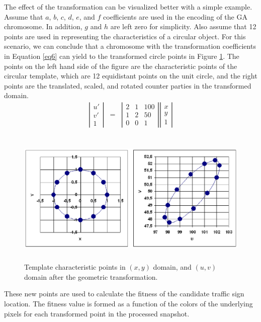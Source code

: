 \documentclass[a4paper,oneside,12pt]{report}
\begin{document}
The effect of the transformation can be visualized better with a simple example. Assume that $a$, $b$, $c$, $d$, $e$, and $f$ coefficients are used in the encoding of the GA chromosome. In addition, $g$ and $h$ are left zero for simplicity. Also assume that 12 points are used in representing the characteristics of a circular object. For this scenario, we can conclude that a chromosome with the transformation coefficients in Equation \ref{eq6} can yield to the transformed circle points in Figure \ref{fig:sdfig6}. The points on the left hand side of the figure are the characteristic points of the circular template, which are 12 equidistant points on the unit circle, and the right points are the translated, scaled, and rotated counter parties in the transformed domain. 
\begin{eqnarray}
\label{eq6}
\left| \begin{array}{ccc} u' \\ v' \\ 1 \end{array} \right| &=& 
\left| \begin{array}{ccc} 2 & 1 & 100 \\ 1 & 2 & 50 \\ 0 & 0 & 1 \end{array} \right| \left| \begin{array}{ccc} x \\ y \\ 1 \end{array} \right|
\end{eqnarray}
\begin{figure}[ht]
\begin{center}
\includegraphics[width=142mm,height=65mm]{img/sdfig6.eps}
\caption{Template characteristic points in $(x,y)$ domain,  and $(u,v)$ domain after the geometric transformation.}
\label{fig:sdfig6}
\end{center}
\end{figure}
\par
These new points are used to calculate the fitness of the candidate traffic sign location. The fitness value is formed as a function of the colors of the underlying pixels for each transformed point in the processed snapshot. 
\end{document}

